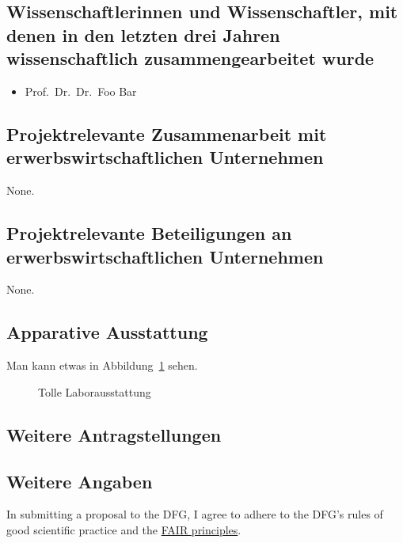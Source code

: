 \documentclass{scrartcl}
\begin{document}
\subsection{Wissenschaftlerinnen und Wissenschaftler, mit denen in den letzten 
drei Jahren wissenschaftlich zusammengearbeitet wurde}
\begin{itemize}
  \item Prof.\ Dr.\ Dr.\ Foo Bar
\end{itemize}

\subsection{Projektrelevante Zusammenarbeit mit erwerbswirtschaftlichen Unternehmen}
None.

\subsection{Projektrelevante Beteiligungen an erwerbswirtschaftlichen Unternehmen}
None.

\subsection{Apparative Ausstattung}
Man kann etwas in Abbildung~\ref{fig:some_nice_graph} sehen.
\begin{figure}
\centering
{}
\caption{Tolle Laborausstattung}
\label{fig:some_nice_graph}
\end{figure}

\subsection{Weitere Antragstellungen}

\subsection{Weitere Angaben}
In submitting a proposal to the DFG, I agree to adhere to the DFG's rules of good scientific practice and the \href{https://www.nature.com/articles/sdata201618}{FAIR principles}.
\end{document}
